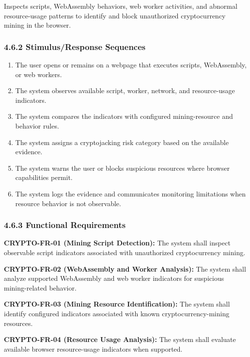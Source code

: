 \documentclass[12pt,a4paper]{report}
\begin{document}
Inspects scripts, WebAssembly behaviors, web worker activities, and abnormal resource-usage patterns to identify and block unauthorized cryptocurrency mining in the browser.\par

\subsubsection*{4.6.2 Stimulus/Response Sequences}

\begin{enumerate}
\item The user opens or remains on a webpage that executes scripts, WebAssembly, or web workers.
\item The system observes available script, worker, network, and resource-usage indicators.
\item The system compares the indicators with configured mining-resource and behavior rules.
\item The system assigns a cryptojacking risk category based on the available evidence.
\item The system warns the user or blocks suspicious resources where browser capabilities permit.
\item The system logs the evidence and communicates monitoring limitations when resource behavior is not observable.
\end{enumerate}

\subsubsection*{4.6.3 Functional Requirements}

\textbf{CRYPTO-FR-01 (Mining Script Detection):} The system shall inspect observable script indicators associated with unauthorized cryptocurrency mining.\par

\textbf{CRYPTO-FR-02 (WebAssembly and Worker Analysis):} The system shall analyze supported WebAssembly and web worker indicators for suspicious mining-related behavior.\par

\textbf{CRYPTO-FR-03 (Mining Resource Identification):} The system shall identify configured indicators associated with known cryptocurrency-mining resources.\par

\textbf{CRYPTO-FR-04 (Resource Usage Analysis):} The system shall evaluate available browser resource-usage indicators when supported.\par
\end{document}
